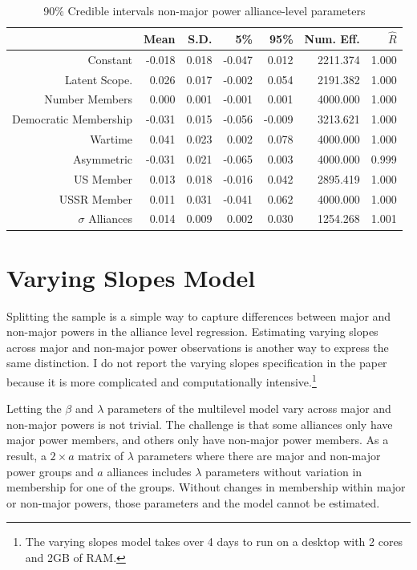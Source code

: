 \documentclass[12pt]{article}
\begin{document}
\begin{table}[ht]
\centering
\begin{tabular}{rrrrrrr}
  \hline
 & Mean & S.D. & 5\% & 95\% & Num. Eff. & $\hat{R}$ \\ 
  \hline
Constant & -0.018 & 0.018 & -0.047 & 0.012 & 2211.374 & 1.000 \\ 
  Latent Scope. & 0.026 & 0.017 & -0.002 & 0.054 & 2191.382 & 1.000 \\ 
  Number Members & 0.000 & 0.001 & -0.001 & 0.001 & 4000.000 & 1.000 \\ 
  Democratic Membership & -0.031 & 0.015 & -0.056 & -0.009 & 3213.621 & 1.000 \\ 
  Wartime & 0.041 & 0.023 & 0.002 & 0.078 & 4000.000 & 1.000 \\ 
  Asymmetric & -0.031 & 0.021 & -0.065 & 0.003 & 4000.000 & 0.999 \\ 
  US Member & 0.013 & 0.018 & -0.016 & 0.042 & 2895.419 & 1.000 \\ 
  USSR Member & 0.011 & 0.031 & -0.041 & 0.062 & 4000.000 & 1.000 \\ 
  $\sigma$ Alliances & 0.014 & 0.009 & 0.002 & 0.030 & 1254.268 & 1.001 \\ 
   \hline
\end{tabular}
\caption{90\% Credible intervals non-major power alliance-level parameters}
\label{tab:alliance-level-min}
\end{table}



\section{Varying Slopes Model}

Splitting the sample is a simple way to capture differences between major and non-major powers in the alliance level regression. 
Estimating varying slopes across major and non-major power observations is another way to express the same distinction. 
I do not report the varying slopes specification in the paper because it is more complicated and computationally intensive.\footnote{The varying slopes model takes over 4 days to run on a desktop with 2 cores and 2GB of RAM.}  


Letting the $\beta$ and $\lambda$ parameters of the multilevel model vary across major and non-major powers is not trivial. 
The challenge is that some alliances only have major power members, and others only have non-major power members. 
As a result, a $2 \times a$ matrix of $\lambda$ parameters where there are major and non-major power groups and $a$ alliances includes $\lambda$ parameters without variation in membership for one of the groups. 
Without changes in membership within major or non-major powers, those parameters and the model cannot be estimated. 
\end{document}
